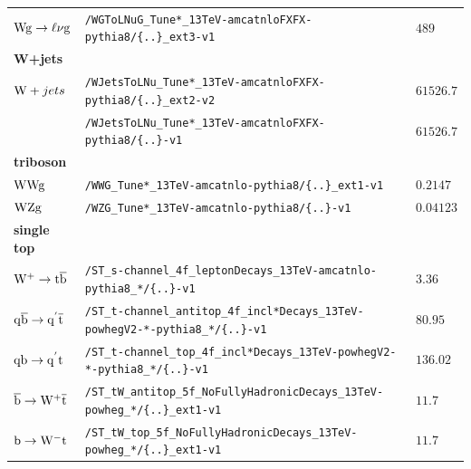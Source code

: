 \begin{table}[tb]
\begin{tabular}[width=\textwidth]{lll}
  $\mathrm{W}\mathrm{g}\to\ell\nu\mathrm{g}$                           & \verb|/WGToLNuG_Tune*_13TeV-amcatnloFXFX-pythia8/{..}_ext3-v1| & $489$                                     \\
  \textbf{W+jets}                                  &                         &                                           \\
  $\mathrm{W}+jets$                                       & \verb|/WJetsToLNu_Tune*_13TeV-amcatnloFXFX-pythia8/{..}_ext2-v2| & $61526.7$                                 \\
                                                   & \verb|/WJetsToLNu_Tune*_13TeV-amcatnloFXFX-pythia8/{..}-v1| & $61526.7$                                 \\
  \textbf{triboson}                                &                         &                                           \\
  $\mathrm{W}\mathrm{W}\mathrm{g}$                                      & \verb|/WWG_Tune*_13TeV-amcatnlo-pythia8/{..}_ext1-v1| & $0.2147$                                  \\
  $\mathrm{W}\mathrm{Z}\mathrm{g}$                                      & \verb|/WZG_Tune*_13TeV-amcatnlo-pythia8/{..}-v1| & $0.04123$                                 \\
  \textbf{single top}                              &                         &                                           \\
  $\mathrm{W^+}\to\mathrm{t}\overline{\mathrm{b}}$                             & \verb|/ST_s-channel_4f_leptonDecays_13TeV-amcatnlo-pythia8_*/{..}-v1| & $3.36$                                    \\
  $\mathrm{q}\overline{\mathrm{b}}\to\mathrm{q}^{'}\overline{\mathrm{t}}$                    & \verb|/ST_t-channel_antitop_4f_incl*Decays_13TeV-powhegV2-*-pythia8_*/{..}-v1| & $80.95$                                   \\
  $\mathrm{q}\mathrm{b}\to\mathrm{q}^{'}\mathrm{t}$                      & \verb|/ST_t-channel_top_4f_incl*Decays_13TeV-powhegV2-*-pythia8_*/{..}-v1| & $136.02$                                  \\
  $\overline{\mathrm{b}}\to\mathrm{W^+}\overline{\mathrm{t}}$                            & \verb|/ST_tW_antitop_5f_NoFullyHadronicDecays_13TeV-powheg_*/{..}_ext1-v1| & $11.7$                                    \\
  $\mathrm{b}\to\mathrm{W^-}\mathrm{t}$                              & \verb|/ST_tW_top_5f_NoFullyHadronicDecays_13TeV-powheg_*/{..}_ext1-v1| & $11.7$                                    \\
  \hline
 \end{tabular}
\end{table}

